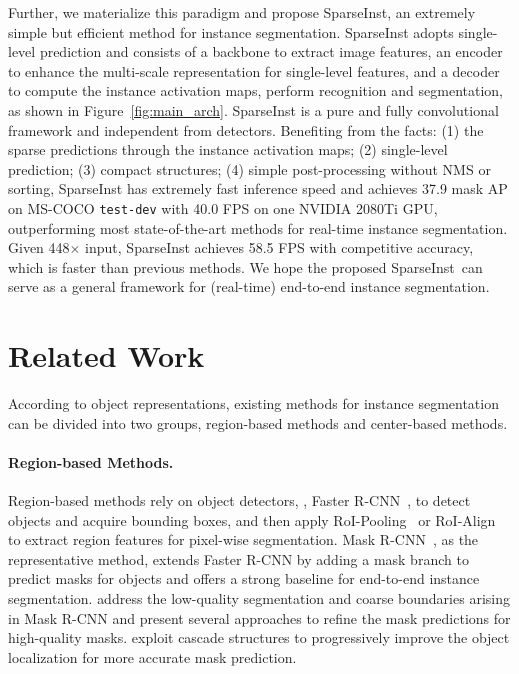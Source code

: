 \documentclass[10pt,twocolumn,letterpaper]{article}
\newcommand{\name}{SparseInst}
\begin{document}
Further, we materialize this paradigm and propose \name, an extremely simple but efficient method for instance segmentation.
\name{} adopts single-level prediction and consists of a backbone to extract image features, an encoder to enhance the multi-scale representation for single-level features, and a decoder to compute the instance activation maps, perform recognition and segmentation, as shown in Figure~\ref{fig:main_arch}.
\name{} is a pure and fully convolutional framework and independent from detectors.
Benefiting from the facts: (1) the sparse predictions through the instance activation maps; (2) single-level prediction; (3) compact structures; (4) simple post-processing without NMS or sorting, \name{} has extremely fast inference speed and achieves 37.9 mask AP on MS-COCO \texttt{test-dev} with 40.0 FPS on one NVIDIA 2080Ti GPU,  outperforming most state-of-the-art methods for real-time instance segmentation. 
Given 448$\times$ input, \name{} achieves 58.5 FPS with competitive accuracy, which is faster than previous methods.
We hope the proposed \name~can serve as a general framework for (real-time) end-to-end instance segmentation.

\section{Related Work}
According to object representations, existing methods for instance segmentation can be divided into two groups, \ie region-based methods and center-based methods.
\paragraph{Region-based Methods.}
Region-based methods rely on object detectors, \eg, Faster R-CNN~\cite{FRCNNRenHG017}, to detect objects and acquire bounding boxes, and then apply RoI-Pooling~\cite{FRCNNRenHG017} or RoI-Align~\cite{MaskRCNNHeGDG17} to extract region features for pixel-wise segmentation. 
Mask R-CNN~\cite{MaskRCNNHeGDG17}, as the representative method, extends Faster R-CNN by adding a mask branch to predict masks for objects and offers a strong baseline for end-to-end instance segmentation.
\cite{PointRendKirillovWHG20,BMaskChengWH020,SegFixYuanXCW20,boundarypatchTangCLLZH21} address the low-quality segmentation and coarse boundaries arising in Mask R-CNN and present several approaches to refine the mask predictions for high-quality masks.
\cite{CascdeCaiV21,ChenPWXLSF0SOLL19} exploit cascade structures to progressively improve the object localization for more accurate mask prediction.
\end{document}
